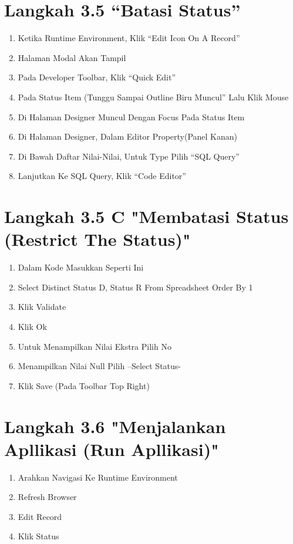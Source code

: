 \documentclass{article}
\begin{document}
\section{Langkah 3.5 “Batasi Status”}
    \begin{enumerate}
     \item Ketika Runtime Environment, Klik “Edit Icon On A Record”
    \item Halaman Modal Akan Tampil
    \item Pada Developer Toolbar, Klik “Quick Edit”
    \item Pada Status Item (Tunggu Sampai Outline Biru Muncul” Lalu Klik Mouse
    \item Di Halaman Designer Muncul Dengan Focus Pada Status Item
    \item Di Halaman Designer, Dalam Editor Property(Panel Kanan)
    \item Di Bawah Daftar Nilai-Nilai, Untuk Type Pilih “SQL Query”
    \item Lanjutkan Ke SQL Query, Klik “Code Editor”

    \end{enumerate}
\section{Langkah 3.5 C "Membatasi Status (Restrict The Status)"}
\begin{enumerate}
    \item Dalam Kode Masukkan Seperti Ini
    \item Select Distinct Status D, Status R From Spreadsheet Order By 1
    \item Klik Validate
    \item Klik Ok
    \item Untuk Menampilkan Nilai Ekstra Pilih No
    \item Menampilkan Nilai Null Pilih –Select Status-
    \item Klik Save (Pada Toolbar Top Right)
 
\end{enumerate}
\section{Langkah 3.6 "Menjalankan Apllikasi (Run Apllikasi)"}
\begin{enumerate}
    \item Arahkan Navigasi Ke Runtime Environment
    \item Refresh Browser
    \item Edit Record
    \item Klik Status

\end{enumerate}
\end{document}

